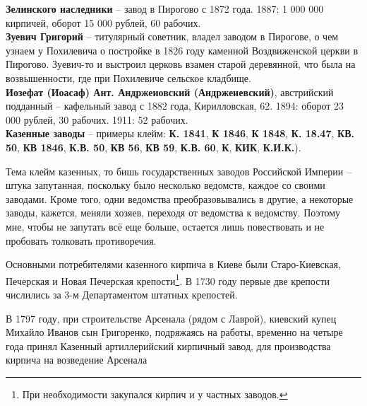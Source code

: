 \noindent\textbf{Зелинского наследники} – завод в Пирогово с 1872 года. 1887: 1 000 000 кирпичей, оборот 15 000 рублей, 60 рабочих.\\

\noindent\textbf{Зуевич Григорий} – титулярный советник, владел заводом в Пирогове, о чем узнаем у Похилевича о постройке в 1826 году каменной Воздвиженской церкви в Пирогово. Зуевич-то и выстроил церковь взамен старой деревянной, что была на возвышенности, где при Похилевиче сельское кладбище.\\


\noindent\textbf{Иозефат (Иоасаф) Ант. Андржеиовский (Андржеиевский)}, австрийский подданный – кафельный завод с 1882 года, Кирилловская, 62. 1894: оборот 23 000 рублей, 30 рабочих. 1911: 52 рабочих.\\

\noindent\textbf{Казенные заводы} – примеры клейм: \textbf{К. 1841}, \textbf{К 1846}, \textbf{К 1848}, \textbf{К. 18.47}, \textbf{КВ. 50}, \textbf{КВ 1846}, \textbf{К.В. 50}, \textbf{КВ 56}, \textbf{КВ 59}, \textbf{К.В. 60}, \textbf{К}, \textbf{КИК}, \textbf{К.И.К.}).

Тема клейм казенных, то бишь государственных заводов Российской Империи – штука запутанная, поскольку было несколько ведомств, каждое со своими заводами. Кроме того, одни ведомства преобразовывались в другие, а некоторые заводы, кажется, меняли хозяев, переходя от ведомства к ведомству. Поэтому мне, чтобы не запутать всё еще больше, остается лишь повествовать и не пробовать толковать противоречия.

Основными потребителями казенного кирпича в Киеве были Старо-Киевская, Печерская и Новая Печерская крепости\footnote{При необходимости закупался кирпич и у частных заводов.}. В 1730 году первые две крепости числились за 3-м Департаментом штатных крепостей.

В 1797 году, при строительстве Арсенала (рядом с Лаврой), киевский купец Михайло Иванов сын Григоренко, подряжаясь на работы, временно на четыре года принял Казенный артиллерийский кирпичный завод, для производства кирпича на возведение Арсенала


